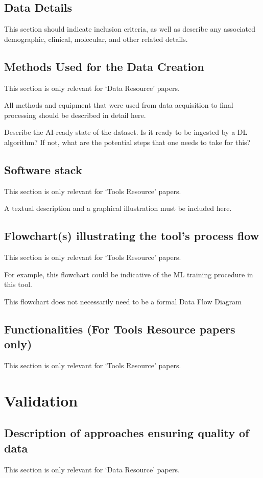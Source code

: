 \documentclass{melba}
\begin{document}
    \subsection{Data Details}
	This section should indicate inclusion criteria, as well as describe any associated demographic, clinical, molecular, and other related details.

    \subsection{Methods Used for the Data Creation}
	This section is only relevant for ‘Data Resource’ papers.

	All methods and equipment that were used from data acquisition to final processing should be described in detail here.

	Describe the AI-ready state of the dataset. Is it ready to be ingested by a DL algorithm? If not, what are the potential steps that one needs to take for this?

    \subsection{Software stack}
	This section is only relevant for ‘Tools Resource’ papers.

	A textual description and a graphical illustration must be included here.

    \subsection{Flowchart(s) illustrating the tool’s process flow}
	This section is only relevant for ‘Tools Resource’ papers.

	For example, this flowchart could be indicative of the ML training procedure in this tool.

	This flowchart does not necessarily need to be a formal Data Flow Diagram

    \subsection{Functionalities (For Tools Resource papers only)}
	This section is only relevant for ‘Tools Resource’ papers.

\section{Validation}
    \subsection{Description of approaches ensuring quality of data}
	This section is only relevant for ‘Data Resource’ papers.
\end{document}
